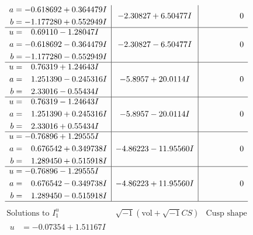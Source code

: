 \documentclass[1p]{elsarticle_modified}
\theoremstyle{definition}
\newcommand{\I}{\sqrt{-1}}
\begin{document}
$$\begin{array}{c|c|c}
\begin{aligned}
a &= -0.618692 + 0.364479 I \\
b &= -1.177280 + 0.552949 I\end{aligned}
 & -2.30827 + 6.50477 I & \phantom{-0.000000 } 0 \\ \hline\begin{aligned}
u &= \phantom{-}0.69110 - 1.28047 I \\
a &= -0.618692 - 0.364479 I \\
b &= -1.177280 - 0.552949 I\end{aligned}
 & -2.30827 - 6.50477 I & \phantom{-0.000000 } 0 \\ \hline\begin{aligned}
u &= \phantom{-}0.76319 + 1.24643 I \\
a &= \phantom{-}1.251390 - 0.245316 I \\
b &= \phantom{-}2.33016 - 0.55434 I\end{aligned}
 & -5.8957 + 20.0114 I & \phantom{-0.000000 } 0 \\ \hline\begin{aligned}
u &= \phantom{-}0.76319 - 1.24643 I \\
a &= \phantom{-}1.251390 + 0.245316 I \\
b &= \phantom{-}2.33016 + 0.55434 I\end{aligned}
 & -5.8957 - 20.0114 I & \phantom{-0.000000 } 0 \\ \hline\begin{aligned}
u &= -0.76896 + 1.29555 I \\
a &= \phantom{-}0.676542 + 0.349738 I \\
b &= \phantom{-}1.289450 + 0.515918 I\end{aligned}
 & -4.86223 - 11.95560 I & \phantom{-0.000000 } 0 \\ \hline\begin{aligned}
u &= -0.76896 - 1.29555 I \\
a &= \phantom{-}0.676542 - 0.349738 I \\
b &= \phantom{-}1.289450 - 0.515918 I\end{aligned}
 & -4.86223 + 11.95560 I & \phantom{-0.000000 } 0\\
 \hline 
 \end{array}$$\newpage$$\begin{array}{c|c|c}  
\text{Solutions to }I^u_{1}& \I (\text{vol} + \sqrt{-1}CS) & \text{Cusp shape}\\
 \hline 
\begin{aligned}
u &= -0.07354 + 1.51167 I \\

\end{aligned}
\end{array}$$
\end{document}
